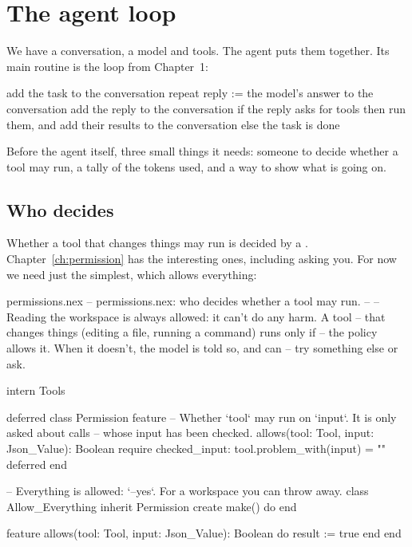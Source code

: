\chapter{The agent loop}\label{ch:loop}

We have a conversation, a model and tools. The agent puts them together.
Its main routine is the loop from Chapter~1:

\begin{shell}
add the task to the conversation
repeat
    reply := the model's answer to the conversation
    add the reply to the conversation
    if the reply asks for tools then
        run them, and add their results to the conversation
    else
        the task is done
\end{shell}

Before the agent itself, three small things it needs: someone to decide
whether a tool may run, a tally of the tokens used, and a way to show what
is going on.

\section{Who decides}

Whether a tool that changes things may run is decided by a
. Chapter~\ref{ch:permission} has the interesting ones,
including asking you. For now we need just the simplest, which allows
everything:

\begin{newfile}{permissions.nex}
-- permissions.nex: who decides whether a tool may run.
--
-- Reading the workspace is always allowed: it can't do any harm. A tool
-- that changes things (editing a file, running a command) runs only if
-- the policy allows it. When it doesn't, the model is told so, and can
-- try something else or ask.

intern Tools

deferred class Permission
feature
  -- Whether `tool` may run on `input`. It is only asked about calls
  -- whose input has been checked.
  allows(tool: Tool, input: Json_Value): Boolean
  require
    checked_input: tool.problem_with(input) = ""
  deferred
end

-- Everything is allowed: `--yes`. For a workspace you can throw away.
class Allow_Everything inherit Permission
create
  make() do
  end

feature
  allows(tool: Tool, input: Json_Value): Boolean do
    result := true
  end
end
\end{newfile}


